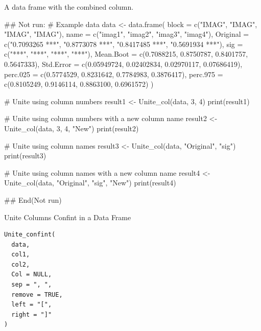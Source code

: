 \documentclass[a4paper]{book}
\begin{document}
%
\begin{Value}
A data frame with the combined column.
\end{Value}
%
\begin{Examples}
\begin{ExampleCode}
## Not run: 
# Example data
data <- data.frame(
  block = c("IMAG", "IMAG", "IMAG", "IMAG"),
  name = c("imag1", "imag2", "imag3", "imag4"),
  Original = c("0.7093265 ***", "0.8773078 ***", "0.8417485 ***", "0.5691934 ***"),
  sig = c("***", "***", "***", "***"),
  Mean.Boot = c(0.7088215, 0.8750787, 0.8401757, 0.5647333),
  Std.Error = c(0.05949724, 0.02402834, 0.02970117, 0.07686419),
  perc.025 = c(0.5774529, 0.8231642, 0.7784983, 0.3876417),
  perc.975 = c(0.8105249, 0.9146114, 0.8863100, 0.6961572)
)

# Unite using column numbers
result1 <- Unite_col(data, 3, 4)
print(result1)

# Unite using column numbers with a new column name
result2 <- Unite_col(data, 3, 4, "New")
print(result2)

# Unite using column names
result3 <- Unite_col(data, "Original", "sig")
print(result3)

# Unite using column names with a new column name
result4 <- Unite_col(data, "Original", "sig", "New")
print(result4)

## End(Not run)
\end{ExampleCode}
\end{Examples}
%
\begin{Description}
Unite Columns Confint in a Data Frame
\end{Description}
%
\begin{Usage}
\begin{verbatim}
Unite_confint(
  data,
  col1,
  col2,
  Col = NULL,
  sep = ", ",
  remove = TRUE,
  left = "[",
  right = "]"
)
\end{verbatim}
\end{Usage}
%
\end{document}
